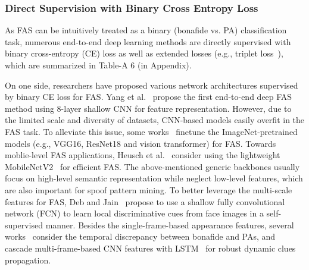 \documentclass[10pt,journal,compsoc]{IEEEtran}
\begin{document}
\subsubsection{Direct Supervision with Binary Cross Entropy Loss}
As FAS can be intuitively treated as a binary (bonafide vs. PA) classification task, numerous end-to-end deep learning methods are directly supervised with binary cross-entropy (CE) loss as well as extended losses (e.g., triplet loss~\cite{hermans2017defense}), which are summarized in Table-A 6 (in Appendix). 

On one side, researchers have proposed various network architectures supervised by binary CE loss for FAS. Yang et al.~\cite{yang2014learn} propose the first end-to-end deep FAS method using 8-layer shallow CNN for feature representation. However, due to the limited scale and diversity of datasets, CNN-based models easily overfit in the FAS task. To alleviate this issue, some works~\cite{lucena2017transfer,chen2019attention,george2020effectiveness} finetune the ImageNet-pretrained models (e.g., VGG16, ResNet18 and  vision transformer) for FAS. Towards moblie-level FAS applications, Heusch et al.~\cite{heusch2020deep} consider using the lightweight MobileNetV2~\cite{sandler2018mobilenetv2} for efficient FAS. The above-mentioned generic backbones usually focus on high-level semantic representation while neglect low-level features, which are also important for spoof pattern mining. To better leverage the multi-scale features for FAS, Deb and Jain~\cite{deb2020look} propose to use a shallow fully convolutional network (FCN) to learn local discriminative cues from face images in a self-supervised manner. Besides the single-frame-based appearance features, several works~\cite{Xu2016Learning,muhammad2019face,yang2019face,ge2020face} consider the temporal discrepancy between bonafide and PAs, and cascade multi-frame-based CNN features with LSTM~\cite{hochreiter1997long} for robust dynamic clues propagation. 
\end{document}

